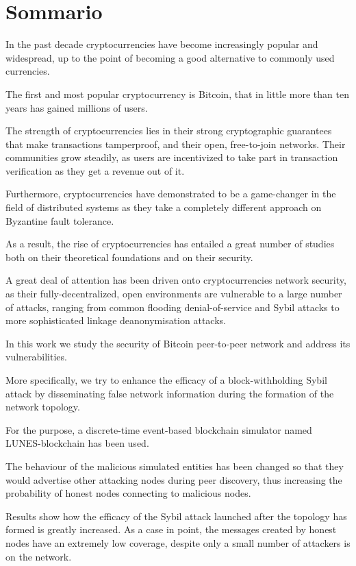 \chapter*{Sommario} %
\label{sommario}

In the past decade cryptocurrencies have become increasingly popular and widespread, up to the point of becoming a good alternative to commonly used currencies.

The first and most popular cryptocurrency is Bitcoin, that in little more than ten years has gained millions of users.

The strength of cryptocurrencies lies in their strong cryptographic guarantees that make transactions tamperproof, and their open, free-to-join networks. Their communities grow steadily, as users are incentivized to take part in transaction verification as they get a revenue out of it.
 
Furthermore, cryptocurrencies have demonstrated to be a game-changer in the field of distributed systems as they take a completely different approach on Byzantine fault tolerance.

As a result, the rise of cryptocurrencies has entailed a great number of studies both on their theoretical foundations and on their security.

A great deal of attention has been driven onto cryptocurrencies network security, as their fully-decentralized, open environments are vulnerable to a large number of attacks, ranging from common flooding denial-of-service and Sybil attacks to more sophisticated linkage deanonymisation attacks.

In this work we study the security of Bitcoin peer-to-peer network and address its vulnerabilities.

More specifically, we try to enhance the efficacy of a block-withholding Sybil attack by disseminating false network information during the formation of the network topology. 

For the purpose, a discrete-time event-based blockchain simulator named LUNES-blockchain has been used.

The behaviour of the malicious simulated entities has been changed so that they would advertise other attacking nodes during peer discovery, thus increasing the probability of honest nodes connecting to malicious nodes.

Results show how the efficacy of the Sybil attack launched after the topology has formed is greatly increased. As a case in point, the messages created by honest nodes have an extremely low coverage, despite only a small number of attackers is on the network. 

